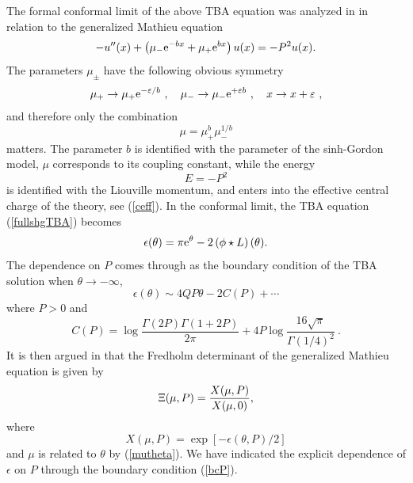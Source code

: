 \documentclass[a4paper,11pt]{article}
\theoremstyle{definition}
\newcommand{\re}{{\rm e}}
\def\[{\left[}
\def\]{\right]}
\begin{document}
The formal conformal limit of the above TBA equation was analyzed in
\cite{post-zamo} in relation to the generalized Mathieu equation
%
\begin{equation}
  -u''(x)+ \left(\mu_- \re^{-bx}+ \mu_+\re^{bx}\right) u(x)=-P^2 u(x). 
\end{equation}
%
The parameters $\mu_\pm$ have the following obvious symmetry
%
\begin{equation}
  \mu_+ \to \mu_+ \re^{-\varepsilon/b}\ ,\quad \mu_-
  \to\mu_-\re^{+\varepsilon b} \ ,\quad x\to x+\varepsilon \ ,
\end{equation}
%
and therefore only the combination
%
\begin{equation}
  \mu = \mu_+^b \mu_-^{1/b}
\end{equation}
%
matters. The parameter $b$ is identified with the parameter of the sinh-Gordon model, $\mu$ corresponds to its coupling constant, while the energy
%
\begin{equation}
  E=-P^2
\end{equation}
% 
is identified with the Liouville momentum, and enters into the effective central charge of the theory, see (\ref{ceff}). 
In the conformal limit, the TBA equation (\ref{fullshgTBA}) 
becomes
%
\begin{equation}\label{eq:TBA-gen}
  \epsilon (\theta)=\pi \re^\theta-2 \left(\phi\star L \right)(\theta). 
\end{equation}
%
The dependence on $P$ comes through as the boundary condition of the
TBA solution when $\theta\rightarrow -\infty$,
%
\begin{equation}
  \label{bcP}
  \epsilon(\theta) \sim 4 QP \theta-2 C(P)+\cdots
\end{equation}
%
where $P>0$ and
%
\begin{equation}
\label{CP}
  C(P) = \log\frac{\Gamma(2P)\Gamma(1+2P)}{2\pi} +
  4P\log\frac{16\sqrt{\pi}}{\Gamma(1/4)^2} \ .
\end{equation}
%
It is then argued in \cite{zamo-sg} that the Fredholm determinant of the generalized
Mathieu equation is given by \cite{post-zamo}
%
\begin{equation}
  \Xi(\mu,P) = {X(\mu,P) \over X(\mu,0)},
\end{equation}
%
where
%
\begin{equation}
  X(\mu,P) = \exp\[-\epsilon(\theta,P)/2\]
\end{equation}
%
and $\mu$ is related to $\theta$ by (\ref{mutheta}). We have indicated the explicit dependence of $\epsilon$ on $P$ through the boundary condition (\ref{bcP}). 
\end{document}
